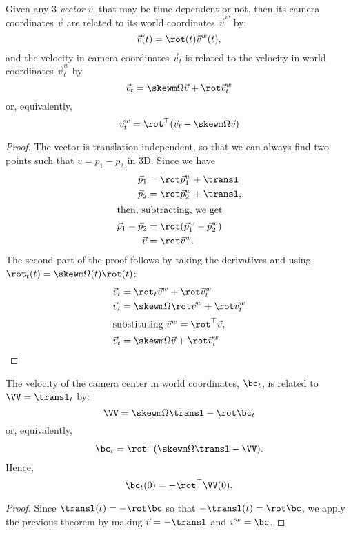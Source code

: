 \begin{proposition}
Given any 3-\emph{vector} $v$, that may be time-dependent or not, then its camera
coordinates $\vec v$ are related to its world coordinates $\vec v^w$ by:
\begin{equation}
\vec v(t) = \rot(t)\vec v^w(t),
\end{equation}
and the velocity in camera coordinates $\vec v_t$ is related to the
velocity in world coordinates $\vec v^w_t$ by
\begin{equation}
\vec v_t = \skewm \Omega\vec v + \rot\vec v^w_t
\end{equation}
or, equivalently,
\begin{equation}
\vec v^w_t = \rot^\top(\vec v_t - \skewm \Omega\vec v)
\end{equation}
\end{proposition}
\begin{proof}
The vector is translation-independent, so that we can always find two points
such that $v = p_1 -p_2$ in 3D. Since we have
\begin{align}
\vec p_1 &= \rot\vec p^w_1 + \transl\\
\vec p_2 &= \rot\vec p^w_2 + \transl,\\
\intertext{then, subtracting, we get}
\vec p_1 -\vec p_2 &= \rot(\vec p^w_1-\vec p^w_2)\\
\vec v &= \rot\vec v^w.
\end{align}
The second part of the proof follows by taking the derivatives and using $\rot_t(t) =
\skewm \Omega(t) \rot(t)$:
\begin{align}
\vec v_t &= \rot_t\vec v^w + \rot\vec v_t^w\\
\vec v_t &= \skewm\Omega \rot\vec v^w + \rot\vec v_t^w\\
%
\shortintertext{substituting $\vec v^w = \rot^\top\vec v$,}
%
\vec v_t &= \skewm\Omega \vec v + \rot\vec v_t^w
\end{align}
\end{proof}
\begin{corolary}
The velocity of the camera center in world coordinates, $\bc_t$, is related to
$\VV = \transl_t$ by:
\begin{equation}\label{eq:VV:from:bc:time:deriv}
\VV = \skewm \Omega\transl - \rot\bc_t
\end{equation}
or, equivalently,
\begin{equation}
\bc_t = \rot^\top(\skewm \Omega\transl - \VV).
\end{equation}
Hence,
\begin{equation}
\bc_t(0) = -\rot^\top\VV(0).
\end{equation}
\end{corolary}
\begin{proof}
Since $\transl(t) = -\rot\bc$ so that $-\transl(t) = \rot\bc$, we apply the previous theorem by making
$\vec v = -\transl$ and $\vec v^w = \bc$.
\end{proof}



